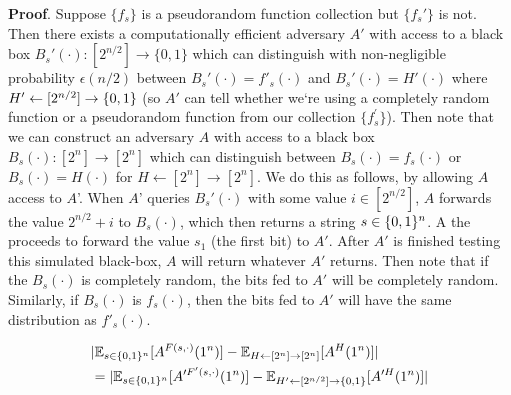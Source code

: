 \documentclass{article}
\begin{document}
\begin{enumerate}[,start=4]
\begin{enumerate}[noitemsep,topsep=\mdcompacttopsep,label=\alph*.]
\begin{mdbmarginx}{1ex}{0pt}{1ex}{0pt}%
\noindent{}\textbf{Proof}.  Suppose $\{f_s\}$ is a pseudorandom function collection but $\{f_s'\}$ is not. Then there exists a 
computationally efficient adversary $A'$ with access to a black box $B_s'(\cdot): [2^{n/2}] \to \{0,1\}$
which can distinguish with non-negligible probability $\epsilon(n/2)$ between $B_s'(\cdot) = f'_s(\cdot)$
and $B_s'(\cdot) = H'(\cdot)$ where $H' \gets [2^{n/2}] \to \{0,1\}$ (so $A'$ can tell whether 
we\textquoteleft{}re using a completely random function or a pseudorandom function from our collection $\{f_s^{\prime}\}$). 
Then note that we can construct an 
adversary $A$ with access to a black box $B_s(\cdot): [2^n] \to [2^n]$ which can distinguish between
$B_s(\cdot) = f_s(\cdot)$ or $B_s(\cdot) = H(\cdot)$ for $H \gets [2^n] \to [2^n]$. We do this as
follows, by allowing $A$ access to $A$\textquoteright{}. When $A$' queries $B_s'(\cdot)$ with some value 
$i \in [2^{n/2}]$, $A$ forwards the value $2^{n/2} + i$ to $B_s(\cdot)$, which then returns a 
string $s \in \{0,1\}^n$. A the proceeds to forward the value $s_1$ (the first bit) to $A'$. After
$A'$ is finished testing this simulated black-box, $A$ will return whatever $A'$ returns. 
Then note that if the $B_s(\cdot)$ is completely random, the bits fed to $A'$ will be completely
random. Similarly, if $B_s(\cdot)$ is $f_s(\cdot)$, then the bits fed to $A'$ will have the
same distribution as $f'_s(\cdot)$.%
\end{mdbmarginx}%
\noindent\noindent\[%
\begin{aligned}
&|\E_{s\in\zo^n}[A^{F(s,\cdot)}(1^n)] - \E_{H \gets [2^n] \to [2^n]}[A^{H}(1^n)]|\\
&= |\E_{s \in \zo^n}[A'^{F'(s,\cdot)}(1^n)] - \E_{H' \gets [2^{n/2}] \to \zo}[A'^{H}(1^n)]| \\

\end{aligned}\]
\end{enumerate}
\end{enumerate}
\end{document}
